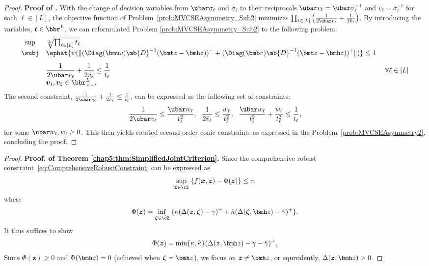 \documentclass[mnsc, nonblindrev]{informswp}
\newcommand{\1}[1]{\mathds{1}{\left(#1\right)}}
\begin{document}
\begin{appendices}
\begin{proof}{\bf Proof of .}
With the change of decision variables from $\ubar \sigma_{\ell}$ and $\bar \sigma_{\ell}$ to their reciprocals $\ubar v_{\ell} = \ubar \sigma^{-1}_{\ell}$ and $\bar v_{\ell} = \bar \sigma^{-1}_{\ell}$ for each $\ell \in [L]$, the objective function of Problem~\eqref{prob:MVCSEAsymmetry_Sub2} minimizes
$\prod_{\ell \in [L]} \left(\frac{1}{2\ubar v_{\ell}} + \frac{1}{2\bar v_{\ell}}\right)$. By introducing the variables, $\bm t \in \bbr^L$, we can reformulated Problem \eqref{prob:MVCSEAsymmetry_Sub2} to the following problem:
\[
\begin{array}{cll}
\sup & \sqrt[L]{\prod_{\ell \in [L]} t_\ell}  \\
\subj & \displaystyle\ephat{\psi(\|(\Diag(\bmu v)\mb{D}^{-1}(\bmt z - \bmh z))^- + (\Diag(\bmb v)\mb{D}^{-1}(\bmt z - \bmh z))^+\|)} \leq 1 \\[3mm]
& \displaystyle \frac{1}{2\ubar v_{\ell}} + \frac{1}{2\bar v_{\ell}} \leq \frac{1}{t_{\ell}} &~\forall \ell \in [L] \\
& \bm v_1,\bm v_2 \in \bbr^L_{++}.  
\end{array} 
\]
The second constraint, $\frac{1}{2\ubar v_{\ell}} + \frac{1}{2\bar v_{\ell}} \leq \frac{1}{t_{\ell}}$, can be expressed as the following set of constraints:
$$
\frac{1}{2 \ubar v_{\ell}} \leq \frac{ \ubar w_{\ell}}{t^2_\ell}, ~~\frac{1}{2 \bar v_{\ell}} \leq \frac{\bar w_{\ell}}{t^2_\ell}, ~~  \frac{\ubar w_{\ell}}{t^2_\ell} + \frac{\bar w_{\ell}}{t^2_\ell}  \leq \frac{1}{t_\ell}, 
$$
for some $\ubar w_{\ell},\bar w_{\ell} \geq 0$. This then yields rotated second-order conic constraints as expressed in the Problem~\eqref{prob:MVCSEAsymmetry2}, concluding the proof. 
\hfill \Halmos
\end{proof}
\vspace{3mm}

\begin{proof}{\bf Proof. of Theorem \ref{chap5:thm:SimplifiedJointCriterion}.}
Since the comprehensive robust constraint~\eqref{eq:ComprehensiveRobustConstraint} can be expressed as
$$
\sup_{\bm{z}\in \cZ} \; \{ f(\bm{x}, \bm{z}) - \Phi(\bm z)\} \leq \tau,
$$
where
$$
\Phi(\bm z) = \inf_{\bm \zeta \in \hat \cZ} \; \{ \kappa (\Delta(\bm z,\bm \zeta) - \gamma)^+ + \hat \kappa ( \Delta(\bm \zeta,\bmh z) - \hat \gamma)^+ \}.
$$
It thus suffices to show 
$$
\Phi(\bm z) = \min\{\kappa,\hat \kappa\}( \Delta(\bm z,\bmh z) - \gamma -\hat \gamma)^+.
$$
Since $\Phi(\bm z) \geq 0$ and $\Phi(\bmh z)=0$ (achieved when $\bm \zeta = \bmh z$), we focus on $\bm z \neq \bmh z$, or equivalently, $\Delta(\bm z,\bmh z)>0$. 


\end{proof}
\end{appendices}
\end{document}
